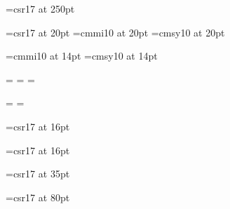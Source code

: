 %
\def\switchletter#1:#2,#3,#4,#5,#6,#7;{\ifcase#1{#2}\or{#3}\or{#4}\or{#5}\or{#6}\or{#7}\fi
}

\def\permutation#1:#2;#3;#4;#5;#6;#7;{\ifcase#1
\answerletter0:#2;#5;\answerletter1:#3;#6;\answerletter2:#4;#7;\or
\answerletter0:#3;#6;\answerletter1:#4;#7;\answerletter2:#2;#5;\or
\answerletter0:#4;#7;\answerletter1:#2;#5;\answerletter2:#3;#6;\or
\answerletter0:#2;#5;\answerletter1:#4;#7;\answerletter2:#3;#6;\or
\answerletter0:#3;#6;\answerletter1:#2;#5;\answerletter2:#4;#7;\or
\answerletter0:#4;#7;\answerletter1:#3;#6;\answerletter2:#2;#5;\fi
}

\def\answerletter#1:#2;#3;{\ifcase#1
\def\letterX{#2}\def\answerX{#3}\or
\def\letterY{#2}\def\answerY{#3}\or
\def\letterZ{#2}\def\answerZ{#3}\fi
}


%
\font\topletterfont=csr17 at 250pt

\font\questionfont=csr17 at 20pt
\font\questionmi=cmmi10 at 20pt
\font\questionsy=cmsy10 at 20pt

\font\scriptmi=cmmi10 at 14pt
\font\scriptsy=cmsy10 at 14pt

=\questionfont
{}=\questionmi
{}=\questionsy

=\scriptmi
{}=\scriptsy

\font\voteletterfont=csr17 at 16pt

\font\notefont=csr17 at 16pt

\font\finishfont=csr17 at 35pt

\font\kompostfont=csr17 at 80pt


%
\nopagenumbers
\parindent=0pt


%
\def\question#1->#2,#3,#4:#5:#6;#7;#8;#9;{
    \permutation#5:\lettertable#2;\lettertable#3;\lettertable#4;#7;#8;#9;
    \baselineskip=32pt
    \centerline{\topletterfont\lettertable#1}
    \vskip2cm
    {\questionfont #6}
    \vskip1cm
    {\questionfont
        \setbox0=\hbox{\voteletterfont\letterX} \line{\hskip1cm \hskip-.5\wd0 \copy0\hskip-.5\wd0\hskip.6cm--\hskip.8cm \answerX\hfil}
        \setbox0=\hbox{\voteletterfont\letterY} \line{\hskip1cm \hskip-.5\wd0 \copy0\hskip-.5\wd0\hskip.6cm--\hskip.8cm \answerY\hfil}
        \setbox0=\hbox{\voteletterfont\letterZ} \line{\hskip1cm \hskip-.5\wd0 \copy0\hskip-.5\wd0\hskip.6cm--\hskip.8cm \answerZ\hfil}
    }
    \footing
}


